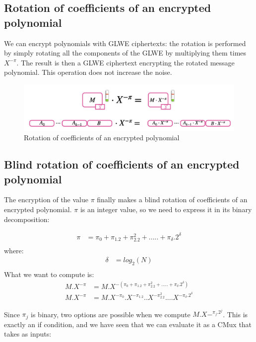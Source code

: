 \documentclass{techrep}
\theoremstyle{definition}
\theoremstyle{plain}
\begin{document}
\subsection{Rotation of coefficients of an encrypted polynomial}
We can encrypt polynomials with GLWE ciphertexts: the rotation is performed by simply rotating all the components of the GLWE by multiplying them times $X^{-\pi}$. The result is then a GLWE ciphertext encrypting the rotated message polynomial. This operation does not increase the noise.

	\begin{figure}[H]
		\centering
	\includegraphics[width=0.9\columnwidth]{fig/rotation_1.png}
		\caption{Rotation of coefficients of an encrypted polynomial}
		\label{fig:rotation_1}
	\end{figure}

\subsection{Blind rotation of coefficients of an encrypted polynomial}
The encryption of the value $\pi$ finally makes a blind rotation of coefficients of an encrypted polynomial. $\pi$ is an integer value, so we need to express it in its binary decomposition: 

    \begin{align*}
    \pi	&= \pi_0 + \pi_1.2 	 + \pi_2.2^2 + ..... + \pi_\delta.2^\delta \\
    \end{align*}
where:
    \begin{align*}
    \delta &= {log}_2(N) \\
    \end{align*}
What we want to compute is:    
    \begin{align*}
    M.X^{-\pi} &= M.X^{-(\pi_0 + \pi_1.2 	 + \pi_2.2^2 + ..... + \pi_\delta.2^\delta)} \\
    M.X^{-\pi} &= M.X^{-\pi_0}.X^{-\pi_1.2}..X^{-\pi_2.2^2}....X^{-\pi_\delta.2^\delta}
    \end{align*}

 Since $\pi_j$ is binary, two options are possible when we compute $M.X-^{\pi_j.2^j}$. This is exactly an if condition, and we have seen that we can evaluate it as a CMux that takes as inputs:
\end{document}
